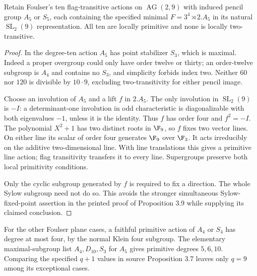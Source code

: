 \begin{proposition}\label{nineplane}
Retain Foulser's ten flag-transitive actions on $\operatorname{AG}(2,9)$
with induced pencil group $A_5$ or $S_5$, each containing the specified
minimal $F=3^4\rtimes2.A_5$ in its natural $\operatorname{SL}_2(9)$
representation. All ten are locally primitive and none is locally
two-transitive.
\end{proposition}
\begin{proof}
In the degree-ten action $A_5$ has point stabilizer $S_3$, which is
maximal. Indeed a proper overgroup could only have order twelve or
thirty; an order-twelve subgroup is $A_4$ and contains no $S_3$, and
simplicity forbids index two. Neither $60$ nor $120$ is divisible by
$10\cdot9$, excluding two-transitivity for either pencil image.

Choose an involution of $A_5$ and a lift $f$ in $2.A_5$. The only
involution in $\operatorname{SL}_2(9)$ is $-I$: a determinant-one
involution in odd characteristic is diagonalizable with both eigenvalues
$-1$, unless it is the identity. Thus $f$ has order four and $f^2=-I$.
The polynomial $X^2+1$ has two distinct roots in $\F_9$, so $f$ fixes
two vector lines. On either line its scalar of order four generates
$\F_9$ over $\F_3$. It acts irreducibly on the additive two-dimensional
line. With line translations this gives a primitive line action;
flag transitivity transfers it to every line. Supergroups preserve both
local primitivity conditions.

Only the cyclic subgroup generated by $f$ is required to fix a direction.
The whole Sylow subgroup need not do so. This avoids the stronger
simultaneous Sylow-fixed-point assertion in the printed proof of
Proposition 3.9 while supplying its claimed conclusion.
\end{proof}

For the other Foulser plane cases, a faithful primitive action of $A_4$
or $S_4$ has degree at most four, by the normal Klein four subgroup.
The elementary maximal-subgroup list $A_4,D_{10},S_3$ for $A_5$ gives
primitive degrees $5,6,10$. Comparing the specified $q+1$ values in
source Proposition 3.7 leaves only $q=9$ among its exceptional cases.
